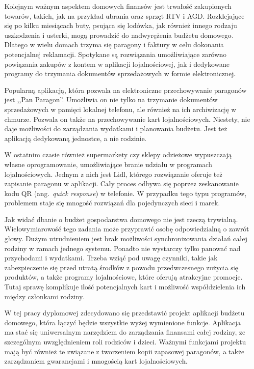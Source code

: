 Kolejnym ważnym aspektem domowych finansów jest trwałość zakupionych towarów, takich, jak na przykład ubrania oraz sprzęt RTV i AGD. Rozklejające się po kilku miesiącach buty, psująca się lodówka, jak również innego rodzaju uszkodzenia i usterki, mogą prowadzić do nadwyrężenia budżetu domowego. Dlatego w wielu domach trzyma się paragony i faktury w celu dokonania potencjalnej reklamacji. Spotykane są rozwiązania umożliwiające zarówno powiązania zakupów z kontem w aplikacji lojalnościowej, jak i dedykowane programy do trzymania dokumentów sprzedażowych w formie elektronicznej.

Popularną aplikacją, która pozwala na elektroniczne przechowywanie paragonów jest ,,Pan Paragon''. Umożliwia on nie tylko na trzymanie dokumentów sprzedażowych w pamięci lokalnej telefonu, ale również na ich archiwizację w chmurze. Pozwala on także na przechowywanie kart lojalnościowych. Niestety, nie daje możliwości do zarządzania wydatkami i planowania budżetu. Jest też aplikacją dedykowaną jednostce, a nie rodzinie.

W ostatnim czasie również supermarkety czy sklepy odzieżowe wypuszczają własne oprogramowanie, umożliwiające branie udziału w programach lojalnościowych. Jednym z nich jest Lidl, którego rozwiązanie oferuje też zapisanie paragonu w aplikacji. Cały proces odbywa się poprzez zeskanowanie kodu QR (ang.~\emph{quick response}) w telefonie. W przypadku tego typu programów, problemem staje się mnogość rozwiązań dla pojedynczych sieci i marek.

Jak widać dbanie o budżet gospodarstwa domowego nie jest rzeczą trywialną. Wielowymiarowość tego zadania może przyprawić osobę odpowiedzialną o zawrót głowy. Dużym utrudnieniem jest brak możliwości synchronizowania działań całej rodziny w ramach jednego systemu. Ponadto nie wystarczy tylko panować nad przychodami i wydatkami. Trzeba wziąć pod uwagę czynniki, takie jak zabezpieczenie się przed utratą środków z powodu przedwczesnego zużycia się produktów, a także  programy lojalnościowe, które oferują atrakcyjne promocje. Tutaj sprawę komplikuje ilość potencjalnych kart i możliwość współdzielenia ich między członkami rodziny. 

W tej pracy dyplomowej zdecydowano się przedstawić projekt aplikacji budżetu domowego, która łączyć będzie wszystkie wyżej wymienione funkcje. Aplikacja ma stać się uniwersalnym narzędziem do zarządzania finansami całej rodziny, ze szczególnym uwzględnieniem roli rodziców i dzieci. Ważnymi funkcjami projektu mają być również te związane z tworzeniem kopii zapasowej paragonów, a także zarządzaniem gwarancjami i mnogością kart lojalnościowych.

